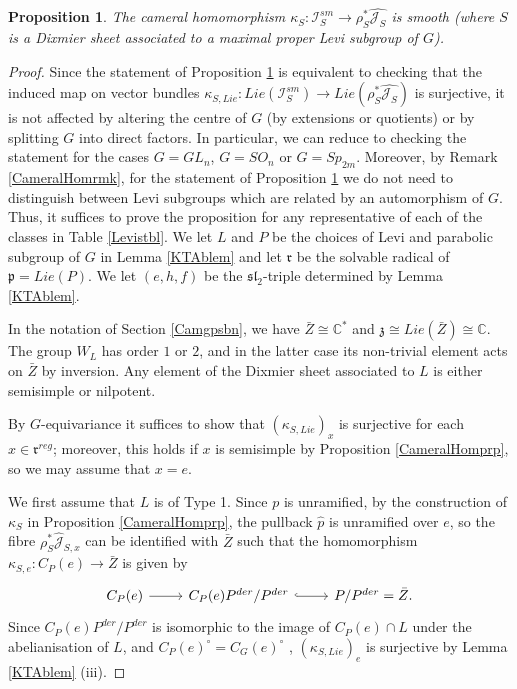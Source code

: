 \documentclass{amsart}
\newtheorem{proposition}[theorem]{Proposition}
\theoremstyle{remark}
\numberwithin{theorem}{section}
\numberwithin{equation}{section}
\begin{document}
\begin{proposition}\label{MLCameralSmoothprp}
    The cameral homomorphism $\kappa_S:\mathcal I_S^{sm} \rightarrow \rho_S^*\hat{\mathcal J_S}$ is smooth (where $S$ is a Dixmier sheet associated to a maximal proper Levi subgroup of $G$).
\end{proposition}

\begin{proof}
Since the statement of Proposition \ref{MLCameralSmoothprp} is equivalent to checking that the induced map on vector bundles $\kappa_{S, Lie}:Lie(\mathcal I_S^{sm}) \rightarrow Lie(\rho_S^*\hat{\mathcal J_S})$ is surjective, it is not affected by altering the centre of $G$ (by extensions or quotients) or by splitting $G$ into direct factors. In particular, we can reduce to checking the statement for the cases $G = GL_n$, $G = SO_n$ or $G=Sp_{2m}$. Moreover, by Remark \ref{CameralHomrmk}, for the statement of Proposition \ref{MLCameralSmoothprp} we do not need to distinguish between Levi subgroups which are related by an automorphism of $G$. Thus, it suffices to prove the proposition for any representative of each of the classes in Table \ref{Levistbl}. We let $L$ and $P$ be the choices of Levi and parabolic subgroup of $G$ in Lemma \ref{KTAblem} and let $\mathfrak{r}$ be the solvable radical of $\mathfrak{p} = Lie(P)$. We let $(e,h,f)$ be the $\mathfrak{sl}_2$-triple determined by Lemma \ref{KTAblem}.

In the notation of Section \ref{Camgpsbn}, we have $\bar{Z} \cong \mathbb{C}^*$ and $\mathfrak{z} \cong Lie(\bar{Z}) \cong \mathbb{C}$. The group $W_L$ has order $1$ or $2$, and in the latter case its non-trivial element acts on $\bar{Z}$ by inversion. Any element of the Dixmier sheet associated to $L$ is either semisimple or nilpotent.

By $G$-equivariance it suffices to show that $(\kappa_{S,Lie})_x$ is surjective for each $x \in \mathfrak{r}^{reg}$; moreover, this holds if $x$ is semisimple by Proposition \ref{CameralHomprp}, so we may assume that $x = e$.

We first assume that $L$ is of Type 1. Since $p$ is unramified, by the construction of $\kappa_S$ in Proposition \ref{CameralHomprp}, the pullback $\hat{p}$ is unramified over $e$, so the fibre $\rho_S^*\hat{\mathcal J}_{S,x}$ can be identified with $\bar{Z}$ such that the homomorphism $\kappa_{S,e}:C_P(e) \rightarrow \bar{Z}$ is given by
\begin{equation}\label{ML1CameralHomeqn}
\begin{tikzcd}
C_P(e) \arrow[r] & C_P(e)P^{der}/P^{der} \arrow[r, hook] & P/P^{der} = \bar{Z}. 
\end{tikzcd}
\end{equation}
Since $C_P(e)P^{der}/P^{der}$ is isomorphic to the image of $C_P(e) \cap L$ under the abelianisation of $L$, and $C_P(e)^\circ = C_G(e)^\circ$ \cite[Zusatz 5.5 (d)]{BK}, $(\kappa_{S,Lie})_e$ is surjective by Lemma \ref{KTAblem} (iii). 


\end{proof}
\end{document}
